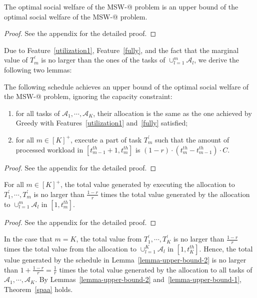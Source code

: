 \documentclass[10pt,journal,compsoc]{IEEEtran}
\makeatletter
\newcommand{\Rmnum}[1]{\expandafter\@slowromancap\romannumeral #1@}
\makeatother
\begin{document}
\begin{lemma}\label{lemma-upper-bound-1}
The optimal social welfare of the MSW-\Rmnum{2} problem is an upper bound of the optimal social welfare of the MSW-\Rmnum{1} problem.
\end{lemma}
\begin{proof}
See the appendix for the detailed proof.
\end{proof}


Due to Feature~\ref{utilization1}, Feature~\ref{fully}, and the fact that the marginal value of $T_{m}^{\prime}$ is no larger than the ones of the tasks of $\cup_{l=1}^{m}{\mathcal{A}_{l}}$, we derive the following two lemmas:

\begin{lemma}\label{lemma-upper-bound-2}
The following schedule achieves an upper bound of the optimal social welfare of the MSW-\Rmnum{2} problem, ignoring the capacity constraint:
\begin{enumerate}

\item for all tasks of $\mathcal{A}_1, \cdots, \mathcal{A}_{K}$, their allocation is the same as the one achieved by Greedy with Features~\ref{utilization1} and~\ref{fully} satisfied;

\item for all $m\in [K]^{+}$, execute a part of task $T_{m}^{\prime}$ such that the amount of processed workload in $\left[t_{m-1}^{th}+1, t_{m}^{th}\right]$ is $(1-r)\cdot\left(t_{m}^{th}-t_{m-1}^{th}\right)\cdot C$.
\end{enumerate}
\end{lemma}
\begin{proof}
See the appendix for the detailed proof.
\end{proof}







\begin{lemma}\label{lemma-interval-value}
For all $m\in [K]^{+}$, the total value generated by executing the allocation to $T_{1}^{\prime}, \cdots, T_{m}^{\prime}$ is no larger than $\frac{1-r}{r}$ times the total value generated by the allocation to $\cup_{l=1}^{m}{\mathcal{A}_{l}}$ in $[1, t_{m}^{th}]$.
\end{lemma}
\begin{proof}
See the appendix for the detailed proof.
\end{proof}

In the case that $m=K$, the total value from $T_{1}^{\prime}, \cdots, T_{K}^{\prime}$ is no larger than $\frac{1-r}{r}$ times the total value from the allocation to $\cup_{l=1}^{K}{\mathcal{A}_{l}}$ in $[1, t_{K}^{th}]$. Hence, the total value generated by the schedule in Lemma~\ref{lemma-upper-bound-2} is no larger than $1+\frac{1-r}{r}=\frac{1}{r}$ times the total value generated by the allocation to all tasks of $\mathcal{A}_{1}, \cdots, \mathcal{A}_{K}$. By Lemmas~\ref{lemma-upper-bound-2} and~\ref{lemma-upper-bound-1}, Theorem~\ref{spaa} holds.
\end{document}
